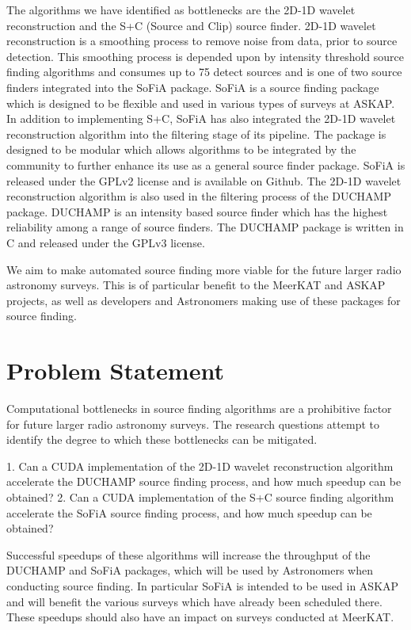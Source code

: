 \documentclass[prodmode,acmtecs]{acmsmall} \usepackage[ruled]{algorithm2e}
\begin{document}
The algorithms we have identified as bottlenecks are the 2D-1D wavelet reconstruction and the S+C (Source and Clip) source finder. 2D-1D wavelet reconstruction is a smoothing process to remove noise from data, prior to source detection. This smoothing process is depended upon by intensity threshold source finding algorithms and consumes up to 75%
detect sources and is one of two source finders integrated into the SoFiA package. SoFiA is a source finding package which is designed to be flexible and used in various types of surveys at ASKAP. In addition to implementing S+C, SoFiA has also integrated the 2D-1D wavelet reconstruction algorithm into the filtering stage of its pipeline. The package is designed to be modular which allows algorithms to be integrated by the community to further enhance its use as a general source finder
package. SoFiA is released under the GPLv2 license and is available on Github. The 2D-1D wavelet reconstruction algorithm is also used in the filtering process of the DUCHAMP package. DUCHAMP is an intensity based source finder which has the highest reliability among a range of source finders. The DUCHAMP package is written in C and released under the GPLv3 license.


We aim to make automated source finding  more viable for the future larger radio astronomy surveys. This is of particular benefit to the MeerKAT and ASKAP projects, as well as developers and Astronomers making use of these packages for source finding.



\section{Problem Statement}

Computational bottlenecks in source finding algorithms are a prohibitive factor for future larger radio astronomy surveys. The research questions attempt to identify the degree to which these bottlenecks can be mitigated.


1. Can a CUDA implementation of the 2D-1D wavelet reconstruction algorithm accelerate the DUCHAMP source finding process, and how much speedup can be obtained?
2. Can a CUDA implementation of the S+C source finding algorithm accelerate the SoFiA source finding process, and how much speedup can be obtained?


Successful speedups of these algorithms will increase the throughput of the DUCHAMP and SoFiA packages, which will be used by Astronomers when conducting source finding. In particular SoFiA is intended to be used in ASKAP and will benefit the various surveys which have already been scheduled there. These speedups should also have an impact on surveys conducted at MeerKAT.
\end{document}
